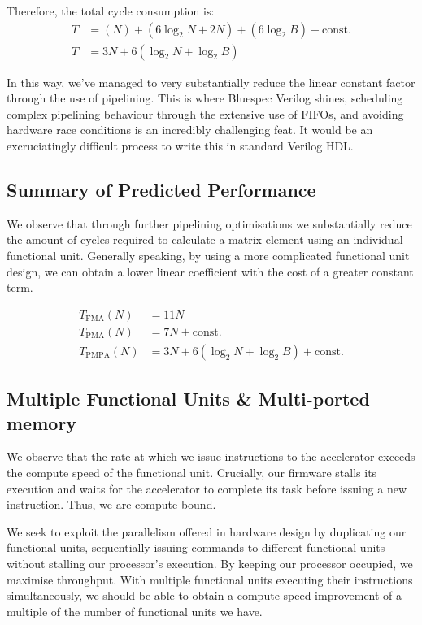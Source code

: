\documentclass[a4paper,8pt]{report}
\begin{document}
Therefore, the total cycle consumption is:
\begin{align*}
  T &= (N) + (6\log_2{N} + 2N) + (6\log_2{B}) + \text{const.} \\
  T &= 3N + 6(\log_2{N} + \log_2{B})
\end{align*}

In this way, we've managed to very substantially reduce the linear constant
factor through the use of pipelining. This is where Bluespec Verilog shines,
scheduling complex pipelining behaviour through the extensive use of FIFOs, and
avoiding hardware race conditions is an incredibly challenging feat. It would be
an excruciatingly difficult process to write this in standard Verilog HDL. 

\subsection{Summary of Predicted Performance}
We observe that through further pipelining optimisations we substantially reduce
the amount of cycles required to calculate a matrix element using an individual
functional unit. Generally speaking, by using a more complicated functional unit
design, we can obtain a lower linear coefficient with the cost of a greater
constant term.

\begin{align*}
  T_{\text{FMA}}(N) &= 11N \\
  T_{\text{PMA}}(N) &= 7N + \text{const.}  \\
  T_{\text{PMPA}}(N) &= 3N + 6(\log_2{N} + \log_2{B}) + \text{const.}
\end{align*}

\subsection{Multiple Functional Units \& Multi-ported memory}
We observe that the rate at which we issue instructions to the accelerator
exceeds the compute speed of the functional unit. Crucially, our firmware stalls
its execution and waits for the accelerator to complete its task before issuing
a new instruction. Thus, we are compute-bound.

We seek to exploit the parallelism offered in hardware design by duplicating our
functional units, sequentially issuing commands to different functional units
without stalling our processor's execution. By keeping our processor occupied,
we maximise throughput. With multiple functional units executing their
instructions simultaneously, we should be able to obtain a compute speed
improvement of a multiple of the number of functional units we have.
\end{document}
